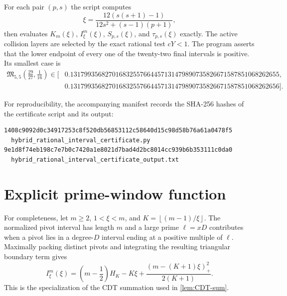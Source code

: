 \documentclass[11pt]{article}
\theoremstyle{definition}
\theoremstyle{remark}
\newcommand{\floor}[1]{\left\lfloor #1\right\rfloor}
\begin{document}
For each pair $(p,s)$ the script computes
\[
 \xi=\frac{12(s(s+1)-1)}{12s^2+(s-1)(p+1)},
\]
then evaluates $K_m(\xi)$, $I^m_\xi(\xi)$, $S_{p,s}(\xi)$, and
$\tau_{p,s}(\xi)$ exactly.  The active collision layers are selected by the
exact rational test $cY<1$.  The program asserts that the lower endpoint of
every one of the twenty-two final intervals is positive.  Its smallest case is
\[
\begin{aligned}
 \mathfrak M_{5,5}\left(\frac{29}{27},\frac1{16}\right)
 \in [&0.131799356827016832557664457131479890735826671587851068262655,\\
      &0.131799356827016832557664457131479890735826671587851068262656].
\end{aligned}
\]

For reproducibility, the accompanying manifest  records the SHA-256 hashes
of the certificate script and its output:
\begin{verbatim}
1408c9092d0c34917253c8f520db56853112c58640d15c98d58b76a61a0478f5
  hybrid_rational_interval_certificate.py
9e1d8f74eb198c7e7b0c7420a1e8021d7bad4d2bc8014cc939b6b353111c0da0
  hybrid_rational_interval_certificate_output.txt
\end{verbatim}

\section{Explicit prime-window function}\label{app:window}

For completeness, let $m\ge2$, $1<\xi<m$, and
$K=\floor{(m-1)/\xi}$.  The normalized pivot interval has length $m$ and a
large prime $\ell=xD$ contributes when a pivot lies in a degree-$D$ interval
ending at a positive multiple of $\ell$.  Maximally packing distinct pivots
and integrating the resulting triangular boundary term gives
\[
 I^m_\xi(\xi)=
 \left(m-\frac12\right)H_K-K\xi
 +\frac{(m-(K+1)\xi)_+^2}{2(K+1)}.
\]
This is the specialization of the CDT summation used in
\cref{lem:CDT-sum}.
\end{document}

